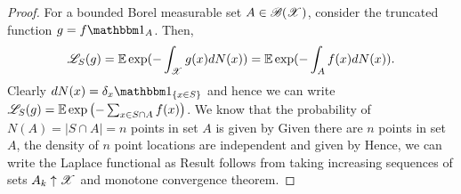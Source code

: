 \documentclass[a4paper,english,10pt]{article}
\begin{document}
\begin{proof}
For a bounded Borel measurable set $A \in \mathscr{B}(\mathscr{X})$, consider the truncated function $g = f\Ind{A}$. 
Then,
\begin{equation*}
\mathscr{L}_{S}(g) 
= \mathbb{E}\exp(-\int_{\mathscr{X}}g(x)dN(x)) 
= \mathbb{E}\exp(-\int_{A}f(x)dN(x)).
\end{equation*} 
Clearly $dN(x) = \delta_{x}\SetIn{x \in S}$ and hence we can write $\mathscr{L}_{S}(g) = \mathbb{E}\exp\left(-\sum_{x \in S\cap A}f(x)\right)$. 
We know that the probability of $N(A) = |S \cap A| = n$ points in set $A$ is given by 
Given there are $n$ points in set $A$, the density of $n$ point locations are independent and given by
Hence, we can write the Laplace functional as 
Result follows from taking increasing sequences of sets $A_k \uparrow \mathscr{X}$ and monotone convergence theorem.
\end{proof}
\end{document}
